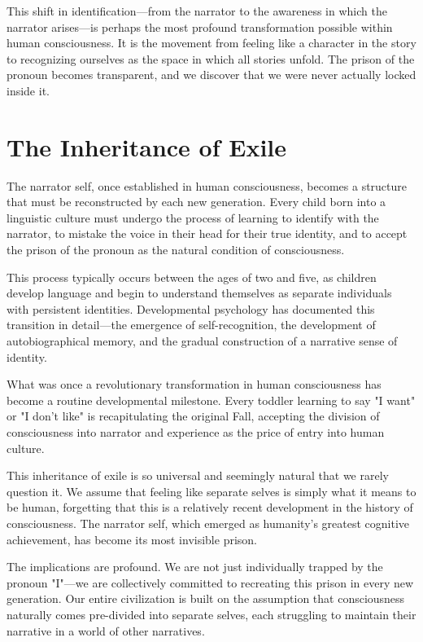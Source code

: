 This shift in identification—from the narrator to the awareness in which the narrator arises—is perhaps the most profound transformation possible within human consciousness. It is the movement from feeling like a character in the story to recognizing ourselves as the space in which all stories unfold. The prison of the pronoun becomes transparent, and we discover that we were never actually locked inside it.

\section{The Inheritance of Exile}

The narrator self, once established in human consciousness, becomes a structure that must be reconstructed by each new generation. Every child born into a linguistic culture must undergo the process of learning to identify with the narrator, to mistake the voice in their head for their true identity, and to accept the prison of the pronoun as the natural condition of consciousness.

This process typically occurs between the ages of two and five, as children develop language and begin to understand themselves as separate individuals with persistent identities. Developmental psychology has documented this transition in detail—the emergence of self-recognition, the development of autobiographical memory, and the gradual construction of a narrative sense of identity.

What was once a revolutionary transformation in human consciousness has become a routine developmental milestone. Every toddler learning to say "I want" or "I don't like" is recapitulating the original Fall, accepting the division of consciousness into narrator and experience as the price of entry into human culture.

This inheritance of exile is so universal and seemingly natural that we rarely question it. We assume that feeling like separate selves is simply what it means to be human, forgetting that this is a relatively recent development in the history of consciousness. The narrator self, which emerged as humanity's greatest cognitive achievement, has become its most invisible prison.

The implications are profound. We are not just individually trapped by the pronoun "I"—we are collectively committed to recreating this prison in every new generation. Our entire civilization is built on the assumption that consciousness naturally comes pre-divided into separate selves, each struggling to maintain their narrative in a world of other narratives.

